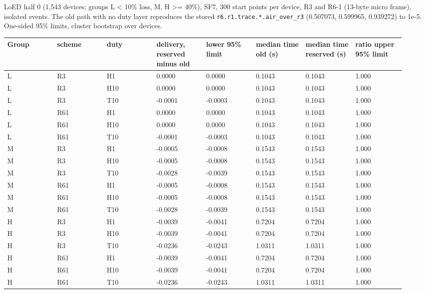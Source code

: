 LoED half 0 (1,543 devices; groups L < 10\% loss, M, H >= 40\%), SF7, 300 start points per device, R3 and R6-1 (13-byte micro frame), isolated events. The old path with no duty layer reproduces the stored \texttt{r6.r1.trace.*.air\_over\_r3} (0.507073, 0.599965, 0.939272) to 1e-5. One-sided 95\% limits, cluster bootstrap over devices.

{\scriptsize\raggedright
\begin{longtable}{p{0.119\linewidth}p{0.119\linewidth}p{0.119\linewidth}p{0.119\linewidth}p{0.119\linewidth}p{0.119\linewidth}p{0.119\linewidth}p{0.119\linewidth}}
\toprule
Group & scheme & duty & delivery, reserved minus old & lower 95\% limit & median time old (s) & median time reserved (s) & ratio upper 95\% limit \\
\midrule
\endhead
L & R3 & H1 & 0.0000 & 0.0000 & 0.1043 & 0.1043 & 1.000 \\
L & R3 & H10 & 0.0000 & 0.0000 & 0.1043 & 0.1043 & 1.000 \\
L & R3 & T10 & -0.0001 & -0.0003 & 0.1043 & 0.1043 & 1.000 \\
L & R61 & H1 & 0.0000 & 0.0000 & 0.1043 & 0.1043 & 1.000 \\
L & R61 & H10 & 0.0000 & 0.0000 & 0.1043 & 0.1043 & 1.000 \\
L & R61 & T10 & -0.0001 & -0.0003 & 0.1043 & 0.1043 & 1.000 \\
M & R3 & H1 & -0.0005 & -0.0008 & 0.1543 & 0.1543 & 1.000 \\
M & R3 & H10 & -0.0005 & -0.0008 & 0.1543 & 0.1543 & 1.000 \\
M & R3 & T10 & -0.0028 & -0.0039 & 0.1543 & 0.1543 & 1.000 \\
M & R61 & H1 & -0.0005 & -0.0008 & 0.1543 & 0.1543 & 1.000 \\
M & R61 & H10 & -0.0005 & -0.0008 & 0.1543 & 0.1543 & 1.000 \\
M & R61 & T10 & -0.0028 & -0.0039 & 0.1543 & 0.1543 & 1.000 \\
H & R3 & H1 & -0.0039 & -0.0041 & 0.7204 & 0.7204 & 1.000 \\
H & R3 & H10 & -0.0039 & -0.0041 & 0.7204 & 0.7204 & 1.000 \\
H & R3 & T10 & -0.0236 & -0.0243 & 1.0311 & 1.0311 & 1.000 \\
H & R61 & H1 & -0.0039 & -0.0041 & 0.7204 & 0.7204 & 1.000 \\
H & R61 & H10 & -0.0039 & -0.0041 & 0.7204 & 0.7204 & 1.000 \\
H & R61 & T10 & -0.0236 & -0.0243 & 1.0311 & 1.0311 & 1.000 \\
\bottomrule
\end{longtable}}

